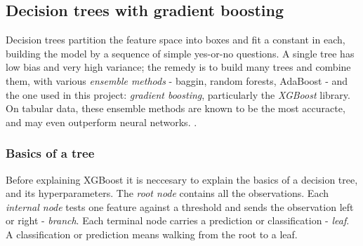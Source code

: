 \subsection{Decision trees with gradient boosting}
\label{sec:theory-xgboost}
Decision trees partition the feature space into boxes and
fit a constant in each, building the model by 
a sequence of simple yes-or-no questions. A single tree 
has low bias and very high variance; the remedy is to build
many trees and combine them, with various \textit{ensemble methods}
- baggin, random forests, AdaBoost - and the one used in this project: 
\textit{gradient boosting}, particularly the \textit{XGBoost} library. 
On tabular data, these ensemble methods are known to be the most accuracte, 
and may even outperform neural networks.
\cite[p.~199]{LectureNotes}. 
\subsubsection{Basics of a tree}
Before explaining XGBoost it is neccesary to explain the basics
of a decision tree, and its hyperparameters.
The \textit{root node} contains all the observations.
Each \textit{internal node} tests one feature against a threshold
and sends the observation left or right - \textit{branch}.
Each terminal node carries a prediction or classification - \textit{leaf}.
A classification or prediction means walking from the root to a leaf.
